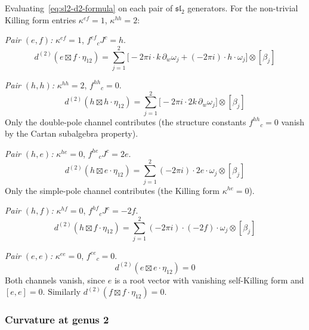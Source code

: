 \begin{computation}
\label{comp:sl2-d2-basis}
Evaluating~\eqref{eq:sl2-d2-formula} on each pair of
$\mathfrak{sl}_2$ generators.  For
the non-trivial Killing form entries $\kappa^{ef} = 1$, $\kappa^{hh} = 2$:

\medskip\noindent
\emph{Pair $(e, f)$:} $\kappa^{ef} = 1$, $f^{ef}{}_c J^c = h$.
\begin{equation}\label{eq:d2-ef}
d^{(2)}(e \boxtimes f \cdot \eta_{12})
= \sum_{j=1}^{2} \bigl[
  -2\pi i \cdot k\, \partial_w\omega_j
  + (-2\pi i) \cdot h \cdot \omega_j
\bigr] \otimes [\beta_j]
\end{equation}

\emph{Pair $(h, h)$:} $\kappa^{hh} = 2$, $f^{hh}{}_c = 0$.
\begin{equation}\label{eq:d2-hh}
d^{(2)}(h \boxtimes h \cdot \eta_{12})
= \sum_{j=1}^{2} \bigl[
  -2\pi i \cdot 2k\, \partial_w\omega_j
\bigr] \otimes [\beta_j]
\end{equation}
Only the double-pole channel contributes (the structure constants
$f^{hh}{}_c = 0$ vanish by the Cartan subalgebra property).

\medskip\noindent
\emph{Pair $(h, e)$:} $\kappa^{he} = 0$, $f^{he}{}_c J^c = 2e$.
\begin{equation}\label{eq:d2-he}
d^{(2)}(h \boxtimes e \cdot \eta_{12})
= \sum_{j=1}^{2} (-2\pi i) \cdot 2e \cdot \omega_j \otimes [\beta_j]
\end{equation}
Only the simple-pole channel contributes (the Killing form
$\kappa^{he} = 0$).

\medskip\noindent
\emph{Pair $(h, f)$:} $\kappa^{hf} = 0$, $f^{hf}{}_c J^c = -2f$.
\begin{equation}\label{eq:d2-hf}
d^{(2)}(h \boxtimes f \cdot \eta_{12})
= \sum_{j=1}^{2} (-2\pi i) \cdot (-2f) \cdot \omega_j \otimes [\beta_j]
\end{equation}

\medskip\noindent
\emph{Pair $(e, e)$:} $\kappa^{ee} = 0$, $f^{ee}{}_c = 0$.
\begin{equation}\label{eq:d2-ee}
d^{(2)}(e \boxtimes e \cdot \eta_{12}) = 0
\end{equation}
Both channels vanish, since $e$ is a root vector with vanishing
self-Killing form and $[e, e] = 0$.  Similarly
$d^{(2)}(f \boxtimes f \cdot \eta_{12}) = 0$.
\end{computation}

\subsubsection{Curvature at genus 2}


